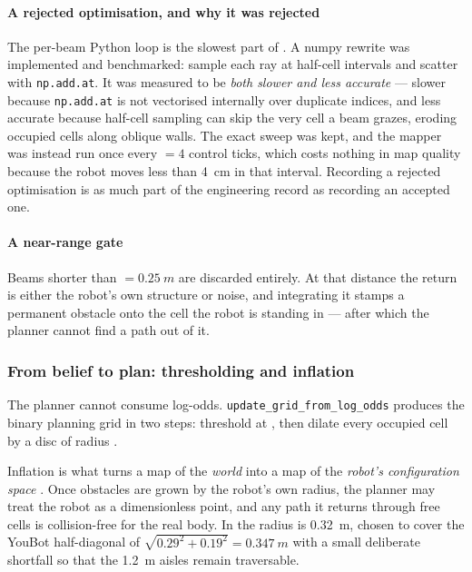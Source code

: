 \paragraph{A rejected optimisation, and why it was rejected}
The per-beam Python loop is the slowest part of \phaseA{}. A numpy
rewrite was implemented and benchmarked: sample each ray at half-cell
intervals and scatter with \texttt{np.add.at}. It was measured to be
\emph{both slower and less accurate} --- slower because
\texttt{np.add.at} is not vectorised internally over duplicate indices,
and less accurate because half-cell sampling can skip the very cell a
beam grazes, eroding occupied cells along oblique walls. The exact
sweep was kept, and the mapper was instead run once every
 $= 4$ control ticks, which costs nothing in map
quality because the robot moves less than \SI{4}{cm} in that interval.
Recording a rejected optimisation is as much part of the engineering
record as recording an accepted one.

\paragraph{A near-range gate}
Beams shorter than  $= \SI{0.25}{m}$ are discarded
entirely. At that distance the return is either the robot's own
structure or noise, and integrating it stamps a permanent obstacle onto
the cell the robot is standing in --- after which the planner cannot
find a path out of it.

\subsubsection{From belief to plan: thresholding and inflation}

The planner cannot consume log-odds. \texttt{update\_grid\_from\_log\_odds}
produces the binary planning grid in two steps: threshold at
, then dilate every occupied cell by a disc of
radius .

Inflation is what turns a map of the \emph{world} into a map of the
\emph{robot's configuration space} \cite{lozanoperez1983spatial}. Once
obstacles are grown by the robot's own radius, the planner may treat the
robot as a dimensionless point, and any path it returns through free
cells is collision-free for the real body. In \phaseA{} the radius is
\SI{0.32}{m}, chosen to cover the YouBot half-diagonal of
$\sqrt{0.29^2 + 0.19^2} = \SI{0.347}{m}$ with a small deliberate
shortfall so that the \SI{1.2}{m} aisles remain traversable.

